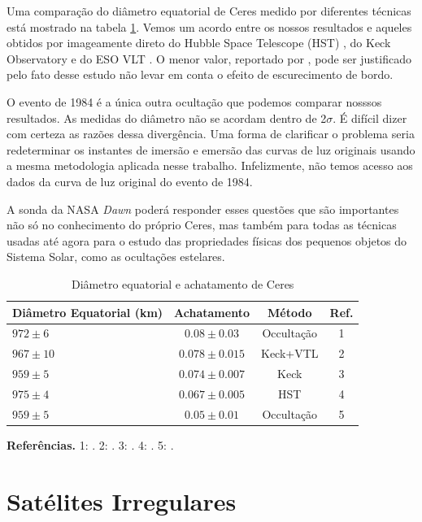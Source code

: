\documentclass[12pt,a4paper]{monografia}
\begin{document}
Uma comparação do diâmetro equatorial de Ceres medido por diferentes técnicas está mostrado na tabela \ref{Tab: Ceres-final}. Vemos um acordo entre os nossos resultados e aqueles obtidos por imageamente direto do Hubble Space Telescope (HST) \citep{Thomas2005}, do Keck Observatory e do ESO VLT \citep{Drummond2014}. O menor valor, reportado por \cite{Carry2008}, pode ser justificado pelo fato desse estudo não levar em conta o efeito de escurecimento de bordo.

O evento de 1984 \citep{Millis1987} é a única outra ocultação que podemos comparar nosssos resultados. As medidas do diâmetro não se acordam dentro de 2$\sigma$. É difícil dizer com certeza as razões dessa divergência. Uma forma de clarificar o problema seria redeterminar os instantes de imersão e emersão das curvas de luz originais usando a mesma metodologia aplicada nesse trabalho. Infelizmente, não temos acesso aos dados da curva de luz original do evento de 1984.

A sonda da NASA \textit{Dawn} poderá responder esses questões que são importantes não só no conhecimento do próprio Ceres, mas também para todas as técnicas usadas até agora para o estudo das propriedades físicas dos pequenos objetos do Sistema Solar, como as ocultações estelares.

\begin{table}[h]
  \caption{Diâmetro equatorial e achatamento de Ceres \label{Tab: Ceres-final}}
  \begin{centering}
  \begin{tabular}{@{}lccc}
  \hline
     Diâmetro Equatorial (km) & Achatamento & Método & Ref. \\
\hline
$972 \pm 6$  & $0.08  \pm 0.03$  & Occultação & 1\\
$967 \pm 10$ & $0.078 \pm 0.015$ & Keck+VTL    & 2\\
$959 \pm 5$  & $0.074 \pm 0.007$ & Keck        & 3\\
$975 \pm 4$  & $0.067 \pm 0.005$ & HST         & 4\\
$959 \pm 5$  & $0.05  \pm 0.01$  & Occultação & 5\\
\hline
\end{tabular}
\par\end{centering}
\textbf{Referências.} 1: \cite{GomesJunior2015-Ceres}. 2: \cite{Drummond2014}. 3: \cite{Carry2008}. 4: \cite{Thomas2005}. 5: \cite{Millis1987}.
\end{table}


\section{Satélites Irregulares}
\label{Sec: Irregulares}
\end{document}
